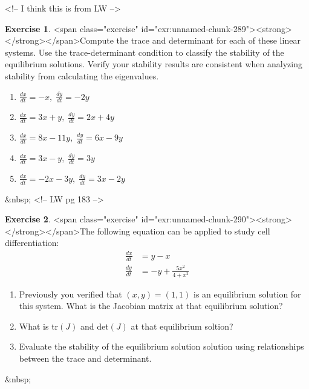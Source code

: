 \documentclass[
]{book}
\theoremstyle{definition}
\theoremstyle{definition}
\theoremstyle{definition}
\newtheorem{exercise}{Exercise}[chapter]
\theoremstyle{remark}
\begin{document}
<!-- I think this is from LW -->
\begin{exercise}
<span class="exercise" id="exr:unnamed-chunk-289"><strong>\label{exr:unnamed-chunk-289} </strong></span>Compute the trace and determinant for each of these linear systems.  Use the trace-determinant condition to classify the stability of the equilibrium solutions. Verify your stability results are consistent when analyzing stability from calculating the eigenvalues.
\begin{enumerate}[label=\alph*.]
\item $\displaystyle \frac{dx}{dt} = -x, \;  \frac{dy}{dt} = -2y$
\item $\displaystyle \frac{dx}{dt} = 3x+y, \;  \frac{dy}{dt} = 2x+4y$
\item $\displaystyle \frac{dx}{dt} = 8x-11y, \;  \frac{dy}{dt} = 6x-9y$
\item $\displaystyle \frac{dx}{dt}= 3x-y, \; \frac{dy}{dt}=3y$
\item $\displaystyle \frac{dx}{dt} = -2x-3y, \;  \frac{dy}{dt} = 3x-2y$
\end{enumerate}
\end{exercise}
&nbsp;
<!-- LW pg 183 -->
\begin{exercise}
<span class="exercise" id="exr:unnamed-chunk-290"><strong>\label{exr:unnamed-chunk-290} </strong></span>The following equation can be applied to study cell differentiation:
  \begin{align*}
\frac{dx}{dt}&=y-x \\
\frac{dy}{dt} &= -y + \frac{5x^{2}}{4+x^{2}}
\end{align*}

\begin{enumerate}[label=\alph*.]
\item Previously you verified that $(x,y)=(1,1)$ is an equilibrium solution for this system.  What is the Jacobian matrix at that equilibrium solution?
  \item What is tr$(J)$ and det$(J)$ at that equilibrium soltion?
\item Evaluate the stability of the equilibrium solution solution using relationships between the trace and determinant.
\end{enumerate}
\end{exercise}
&nbsp;
\end{document}
